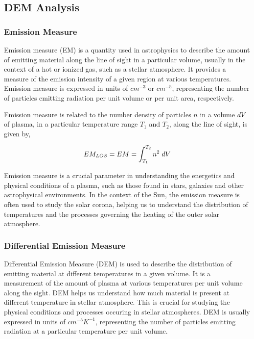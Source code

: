 \subsection{DEM Analysis}

\subsubsection{Emission Measure}

Emission measure (EM) is a quantity used in astrophysics to describe the amount of emitting material along the line of sight in a particular volume, usually in the context of a hot or ionized gas, such as a stellar atmosphere. It provides a measure of the emission intensity of a given region at various temperatures. Emission measure is expressed in units of $cm^{-3}$ or $cm^{-5}$, representing the number of particles emitting radiation per unit volume or per unit area, respectively.

Emission measure is related to the number density of particles $n$ in a volume $dV$ of plasma, in a particular temperature range $T_1$ and $T_2$, along the line of sight, is given by,

\vspace{-0.75cm}
\begin{center}
    \begin{equation*}
        EM_{LOS} = EM = \int_{T_1}^{T_2} n^2 \hspace{0.1cm} dV
    \end{equation*}
\end{center}

Emission measure is a crucial parameter in understanding the energetics and physical conditions of a plasma, such as those found in stars, galaxies and other astrophysical environments. In the context of the Sun, the emission measure is often used to study the solar corona, helping us to understand the distribution of temperatures and the processes governing the heating of the outer solar atmosphere.

\subsubsection{Differential Emission Measure}

Differential Emission Measure (DEM) is used to describe the distribution of emitting material at different temperatures in a given volume. It is a measurement of the amount of plasma at various temperatures per unit volume along the sight. DEM helps us understand how much material is present at different temperature in stellar atmosphere. This is crucial for studying the physical conditions and processes occuring in stellar atmospheres. DEM is usually expressed in units of $cm^{-5}K^{-1}$, representing the number of particles emitting radiation at a particular temperature per unit volume.

